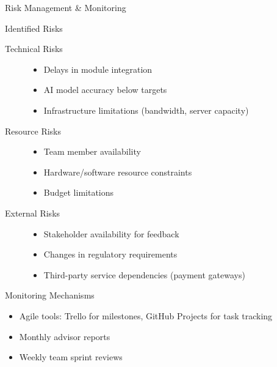 \begin{frame}{Risk Management \& Monitoring}
    \begin{block}{Identified Risks}
        \begin{description}
            \item[Technical Risks]
            \begin{itemize}
                \item Delays in module integration
                \item AI model accuracy below targets
                \item Infrastructure limitations (bandwidth, server capacity)
            \end{itemize}
            
            \item[Resource Risks]
            \begin{itemize}
                \item Team member availability
                \item Hardware/software resource constraints
                \item Budget limitations
            \end{itemize}
            
            \item[External Risks]
            \begin{itemize}
                \item Stakeholder availability for feedback
                \item Changes in regulatory requirements
                \item Third-party service dependencies (payment gateways)
            \end{itemize}
        \end{description}
    \end{block}
    
    \begin{block}{Monitoring Mechanisms}
        \begin{itemize}
            \item Agile tools: Trello for milestones, GitHub Projects for task tracking
            \item Monthly advisor reports
            \item Weekly team sprint reviews
        \end{itemize}
    \end{block}
\end{frame}

